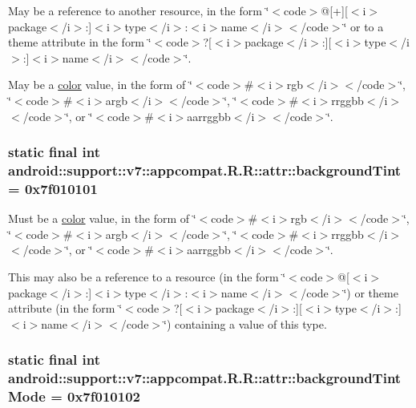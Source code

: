 May be a reference to another resource, in the form \char`\"{}$<$code$>$@\mbox{[}+\mbox{]}\mbox{[}$<$i$>$package$<$/i$>$:\mbox{]}$<$i$>$type$<$/i$>$:$<$i$>$name$<$/i$>$$<$/code$>$\char`\"{} or to a theme attribute in the form \char`\"{}$<$code$>$?\mbox{[}$<$i$>$package$<$/i$>$:\mbox{]}\mbox{[}$<$i$>$type$<$/i$>$:\mbox{]}$<$i$>$name$<$/i$>$$<$/code$>$\char`\"{}. 

May be a \hyperlink{classandroid_1_1support_1_1v7_1_1appcompat_1_1_r_1_1color}{color} value, in the form of \char`\"{}$<$code$>$\#$<$i$>$rgb$<$/i$>$$<$/code$>$\char`\"{}, \char`\"{}$<$code$>$\#$<$i$>$argb$<$/i$>$$<$/code$>$\char`\"{}, \char`\"{}$<$code$>$\#$<$i$>$rrggbb$<$/i$>$$<$/code$>$\char`\"{}, or \char`\"{}$<$code$>$\#$<$i$>$aarrggbb$<$/i$>$$<$/code$>$\char`\"{}. \hypertarget{classandroid_1_1support_1_1v7_1_1appcompat_1_1_r_1_1attr_f3ea8571b324d6df8d7cc519e41a9efa}{
\subsubsection[{backgroundTint}]{\setlength{\rightskip}{0pt plus 5cm}static final int android::support::v7::appcompat.R.R::attr::backgroundTint = 0x7f010101}}
\label{classandroid_1_1support_1_1v7_1_1appcompat_1_1_r_1_1attr_f3ea8571b324d6df8d7cc519e41a9efa}


Must be a \hyperlink{classandroid_1_1support_1_1v7_1_1appcompat_1_1_r_1_1color}{color} value, in the form of \char`\"{}$<$code$>$\#$<$i$>$rgb$<$/i$>$$<$/code$>$\char`\"{}, \char`\"{}$<$code$>$\#$<$i$>$argb$<$/i$>$$<$/code$>$\char`\"{}, \char`\"{}$<$code$>$\#$<$i$>$rrggbb$<$/i$>$$<$/code$>$\char`\"{}, or \char`\"{}$<$code$>$\#$<$i$>$aarrggbb$<$/i$>$$<$/code$>$\char`\"{}. 

This may also be a reference to a resource (in the form \char`\"{}$<$code$>$@\mbox{[}$<$i$>$package$<$/i$>$:\mbox{]}$<$i$>$type$<$/i$>$:$<$i$>$name$<$/i$>$$<$/code$>$\char`\"{}) or theme attribute (in the form \char`\"{}$<$code$>$?\mbox{[}$<$i$>$package$<$/i$>$:\mbox{]}\mbox{[}$<$i$>$type$<$/i$>$:\mbox{]}$<$i$>$name$<$/i$>$$<$/code$>$\char`\"{}) containing a value of this type. \hypertarget{classandroid_1_1support_1_1v7_1_1appcompat_1_1_r_1_1attr_d5552a9694b77697c645dbeef8045bc1}{
\subsubsection[{backgroundTintMode}]{\setlength{\rightskip}{0pt plus 5cm}static final int android::support::v7::appcompat.R.R::attr::backgroundTintMode = 0x7f010102}}
\label{classandroid_1_1support_1_1v7_1_1appcompat_1_1_r_1_1attr_d5552a9694b77697c645dbeef8045bc1}


